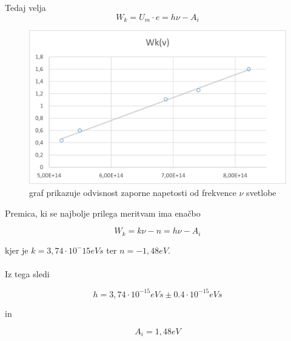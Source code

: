 \documentclass[a4paper]{report}
\begin{document}
\noindent Tedaj velja 
\[W_k = U_m \cdot e = h\nu - A_i\]


\begin{figure}[htp]
    \centering
    \includegraphics[width=15cm]{energija in frekvenca graf.png}
    \caption{graf prikazuje odvisnost  zaporne napetosti od  frekvence $\nu$ svetlobe}
    \label{fig:galaxy}
\end{figure}

\newpage

Premica, ki se najbolje prilega meritvam ima enačbo 

\[W_k =k\nu -n= h\nu - A_i\] 

kjer je $k = 3,74 \cdot 10^-{15}eVs$ ter $n = -1,48 eV$.\\\\
Iz tega sledi

\[h = 3,74 \cdot 10^{-15} eVs \pm0.4 \cdot 10^{-15} eVs\]

in

\[A_i = 1,48 eV \]
\end{document}
